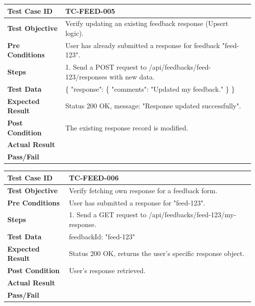 \begin{longtable}{|p{}|p{}|}
\hline
\textbf{Test Case ID} & TC-FEED-005 \\ \hline
\textbf{Test Objective} & Verify updating an existing feedback response (Upsert logic). \\ \hline
\textbf{Pre Conditions} & User has already submitted a response for feedback "feed-123". \\ \hline
\textbf{Steps} & 
1. Send a POST request to /api/feedbacks/feed-123/responses with new data. \\ \hline
\textbf{Test Data} & \{ "response": \{ "comments": "Updated my feedback." \} \} \\ \hline
\textbf{Expected Result} & Status 200 OK, message: "Response updated successfully". \\ \hline
\textbf{Post Condition} & The existing response record is modified. \\ \hline
\textbf{Actual Result} &  \\ \hline
\textbf{Pass/Fail} &  \\ \hline
\end{longtable}

\begin{longtable}{|p{}|p{}|}
\hline
\textbf{Test Case ID} & TC-FEED-006 \\ \hline
\textbf{Test Objective} & Verify fetching own response for a feedback form. \\ \hline
\textbf{Pre Conditions} & User has submitted a response for "feed-123". \\ \hline
\textbf{Steps} & 
1. Send a GET request to /api/feedbacks/feed-123/my-response. \\ \hline
\textbf{Test Data} & feedbackId: "feed-123" \\ \hline
\textbf{Expected Result} & Status 200 OK, returns the user's specific response object. \\ \hline
\textbf{Post Condition} & User's response retrieved. \\ \hline
\textbf{Actual Result} &  \\ \hline
\textbf{Pass/Fail} &  \\ \hline
\end{longtable}

